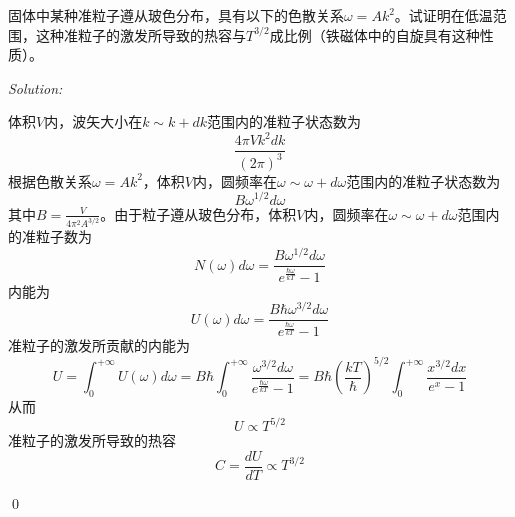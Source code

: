 \documentclass[12pt,a4paper]{article}
\newenvironment{problem}[2][Problem]{\begin{trivlist}
\item[\hskip \labelsep {\bfseries #1}\hskip \labelsep {\bfseries #2.}]}{\end{trivlist}}
\newenvironment{sol}
    {\emph{Solution:}
    }
    {
    \qed
    }
\begin{document}
\begin{problem}{9.12}
固体中某种准粒子遵从玻色分布，具有以下的色散关系$\omega=Ak^2$。试证明在低温范围，这种准粒子的激发所导致的热容与$T^{3/2}$成比例（铁磁体中的自旋具有这种性质）。
\end{problem}
\begin{sol}
体积$V$内，波矢大小在$k\sim k+dk$范围内的准粒子状态数为
\begin{equation}
\frac{4\pi Vk^2dk}{(2\pi)^3}
\end{equation}
根据色散关系$\omega=Ak^2$，体积$V$内，圆频率在$\omega\sim\omega+d\omega$范围内的准粒子状态数为
\begin{equation}
B\omega^{1/2}d\omega
\end{equation}
其中$B=\frac{V}{4\pi^2A^{3/2}}$。由于粒子遵从玻色分布，体积$V$内，圆频率在$\omega\sim\omega+d\omega$范围内的准粒子数为
\begin{equation}
N(\omega)d\omega=\frac{B\omega^{1/2}d\omega}{e^{\frac{\hbar\omega}{kT}}-1}
\end{equation}
内能为
\begin{equation}
U(\omega)d\omega=\frac{B\hbar\omega^{3/2}d\omega}{e^{\frac{\hbar\omega}{kT}}-1}
\end{equation}
准粒子的激发所贡献的内能为
\begin{equation}
U=\int_0^{+\infty}U(\omega)d\omega=B\hbar\int_0^{+\infty}\frac{\omega^{3/2}d\omega}{e^{\frac{\hbar\omega}{kT}}-1}=B\hbar\left(\frac{kT}{\hbar}\right)^{5/2}\int_0^{+\infty}\frac{x^{3/2}dx}{e^x-1}
\end{equation}
从而
\begin{equation}
U\propto T^{5/2}
\end{equation}
准粒子的激发所导致的热容
\begin{equation}
C=\frac{dU}{dT}\propto T^{3/2}
\end{equation}
\end{sol}
\end{document}
